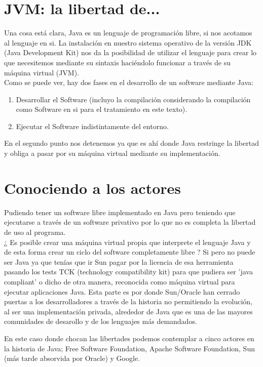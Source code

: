 \documentclass[11pt]{scrartcl}
\begin{document}
\section{JVM: la libertad de...}

Una cosa está clara, Java es un lenguaje de programación libre, si nos acotamos al lenguaje en si. La instalación en nuestro sistema operativo de la versión JDK (Java Development Kit) nos da la posibilidad de utilizar el lenguaje para crear lo que necesitemos mediante su sintaxis haciéndolo funcionar a través de su máquina virtual (JVM).\\
Como se puede ver, hay dos fases en el desarrollo de un software mediante Java:
\begin{enumerate}
    \item Desarrollar el Software (incluyo la compilación considerando la compilación como Software en si para el tratamiento en este texto).
    \item Ejecutar el Software indistintamente del entorno.
\end{enumerate}

En el segundo punto nos detenemos ya que es ahí donde Java restringe la libertad y obliga a pasar por su máquina virtual mediante su implementación.

\section{Conociendo a los actores}

Pudiendo tener un software libre implementado en Java pero teniendo que ejecutarse a través de un software privativo por lo que no es completa la libertad de uso al programa.\\
¿ Es posible crear una máquina virtual propia que interprete el lenguaje Java y de esta forma crear un ciclo del software completamente libre ? Si pero no puede ser Java ya que tenías que ir Sun pagar por la licencia de esa herramienta pasando los tests TCK (technology compatibility kit) para que pudiera ser 'java compliant' o dicho de otra manera, reconocida como máquina virtual para ejecutar aplicaciones Java.
Esta parte es por donde Sun/Oracle han cerrado puertas a los desarrolladores a través de la historia no permitiendo la evolución, al ser una implementación privada, alrededor de Java que es una de las mayores comunidades de desarollo y de los lenguajes más demandados.

En este caso donde chocan las libertades podemos contemplar a cinco actores en la historia de Java; Free Software Foundation, Apache Software Foundation, Sun (más tarde absorvida por Oracle) y Google.
\end{document}
